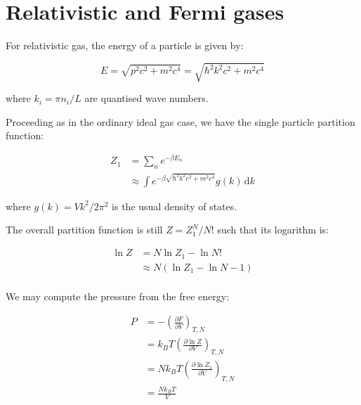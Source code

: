 \documentclass[12pt]{article}
\begin{document}



\pagebreak
\section*{Relativistic and Fermi gases}



For relativistic gas, the energy of a particle is given by:

\begin{equation}
    E = \sqrt{p^{2} c^{2} + m^{2} c^{4}} = \sqrt{\hbar^{2} k^{2} c^{2} + m^{2} c^{4}}
\end{equation}

where $k_{i} = \pi n_{i} / L$ are quantised wave numbers.

Proceeding as in the ordinary ideal gas case, we have the single particle partition function:

\begin{equation}
    \begin{split}
        Z_{1} &= \sum_{n} e^{-\beta E_{n}} \\
        &\approx \int e^{-\beta \sqrt{\hbar^{2} k^{2} c^{2} + m^{2} c^{4}}} g(k) \, \mathrm{d}k
    \end{split}
\end{equation}

where $g(k) = Vk^{2}/2\pi^{2}$ is the usual density of states.

The overall partition function is still $Z = Z_{1}^{N}/N!$ such that its logarithm is:

\begin{equation}
    \begin{split}
        \ln{Z} &= N \ln{Z_{1}} - \ln{N!} \\
        &\approx N \left( \ln{Z_{1}} - \ln{N} - 1 \right) \\
    \end{split}
\end{equation}

We may compute the pressure from the free energy:

\begin{equation}
    \begin{split}
        P &= -\left( \frac{\partial F}{\partial V} \right)_{T, N} \\
        &= k_{B} T \left( \frac{\partial \ln{Z}}{\partial V} \right)_{T, N} \\
        &= N k_{B} T \left( \frac{\partial \ln{Z_{1}}}{\partial V} \right)_{T, N} \\
        &= \frac{N k_{B} T}{V}
    \end{split}
\end{equation}
\end{document}
